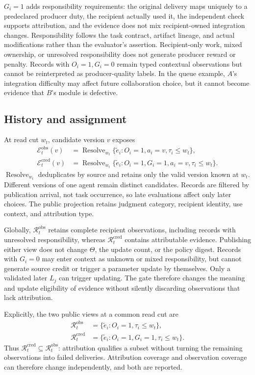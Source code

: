 \documentclass[sigconf,anonymous]{aamas}
\begin{document}
$G_i=1$ adds responsibility requirements: the original delivery maps uniquely to a predeclared producer duty, the recipient actually used it, the independent check supports attribution, and the evidence does not mix recipient-owned integration changes. Responsibility follows the task contract, artifact lineage, and actual modifications rather than the evaluator's assertion. Recipient-only work, mixed ownership, or unresolved responsibility does not generate producer reward or penalty. Records with $O_i=1,G_i=0$ remain typed contextual observations but cannot be reinterpreted as producer-quality labels. In the queue example, $A$'s integration difficulty may affect future collaboration choice, but it cannot become evidence that $B$'s module is defective.

\subsection{History and assignment}
At read cut $w_t$, candidate version $v$ exposes
\begin{align}
\mathcal E_t^{\mathrm{obs}}(v)&=\operatorname{Resolve}_{w_t}
 \{\tilde e_i:O_i=1,a_i=v,\tau_i\leq w_t\},\\
\mathcal E_t^{\mathrm{cred}}(v)&=\operatorname{Resolve}_{w_t}
 \{\tilde e_i:O_i=1,G_i=1,a_i=v,\tau_i\leq w_t\}.
\label{eq:views}
\end{align}
$\operatorname{Resolve}_{w_t}$ deduplicates by source and retains only the valid version known at $w_t$. Different versions of one agent remain distinct candidates. Records are filtered by publication arrival, not task occurrence, so late evaluations affect only later choices. The public projection retains judgment category, recipient identity, use context, and attribution type.

Globally, $\mathcal R_t^{\mathrm{obs}}$ retains complete recipient observations, including records with unresolved responsibility, whereas $\mathcal R_t^{\mathrm{cred}}$ contains attributable evidence. Publishing either view does not change $\Theta$, the update count, or the policy digest. Records with $G_i=0$ may enter context as unknown or mixed responsibility, but cannot generate source credit or trigger a parameter update by themselves. Only a validated later $L_j$ can trigger updating. The gate therefore changes the meaning and update eligibility of evidence without silently discarding observations that lack attribution.

Explicitly, the two public views at a common read cut are
\begin{align}
\mathcal R_t^{\mathrm{obs}}&=\{\tilde e_i:O_i=1,\tau_i\leq w_t\},\\
\mathcal R_t^{\mathrm{cred}}&=\{\tilde e_i:O_i=1,G_i=1,\tau_i\leq w_t\}.
\end{align}
Thus $\mathcal R_t^{\mathrm{cred}}\subseteq\mathcal R_t^{\mathrm{obs}}$: attribution qualifies a subset without turning the remaining observations into failed deliveries. Attribution coverage and observation coverage can therefore change independently, and both are reported.
\end{document}
